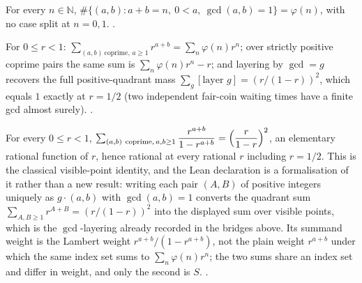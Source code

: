 \begin{thm}
For every $n\in\mathbb{N}$, $\#\{(a,b): a+b=n,\ 0<a,\ \gcd(a,b)=1\} =
\varphi(n)$, with no case split at $n=0,1$.
\quad {} \quad {} \quad {}.
\end{thm}

\begin{prop}
For $0\le r<1$: $\sum_{(a,b)\ \mathrm{coprime},\,a\ge 1} r^{a+b} =
\sum_n \varphi(n)r^n$; over strictly positive coprime pairs the same sum is
$\sum_n\varphi(n)r^n - r$; and layering by $\gcd = g$ recovers the full
positive-quadrant mass $\sum_g[\text{layer }g] = (r/(1-r))^2$, which equals
$1$ exactly at $r=1/2$ (two independent fair-coin waiting times have a
finite gcd almost surely).
\quad {}
\quad {}
\quad {} \quad {} \quad {}.
\end{prop}

\begin{thm}
For every $0\le r<1$, $\sum_{(a,b)\ \mathrm{coprime},\, a,b\ge 1}
\dfrac{r^{a+b}}{1-r^{a+b}} = \Bigl(\dfrac{r}{1-r}\Bigr)^2$, an elementary
rational function of $r$, hence rational at every rational $r$ including
$r=1/2$. This is the classical visible-point identity, and the Lean
declaration is a formalisation of it rather than a new result: writing each
pair $(A,B)$ of positive integers uniquely as $g\cdot(a,b)$ with
$\gcd(a,b)=1$ converts the quadrant sum $\sum_{A,B\ge1}r^{A+B}=(r/(1-r))^2$
into the displayed sum over visible points, which is the $\gcd$-layering
already recorded in the bridges above. Its summand weight is the Lambert
weight $r^{a+b}/(1-r^{a+b})$, not the plain weight $r^{a+b}$ under which the
same index set sums to $\sum_n\varphi(n)r^n$; the two sums share an index set
and differ in weight, and only the second is $S$.
\quad {} \quad {} \quad {}.
\end{thm}

